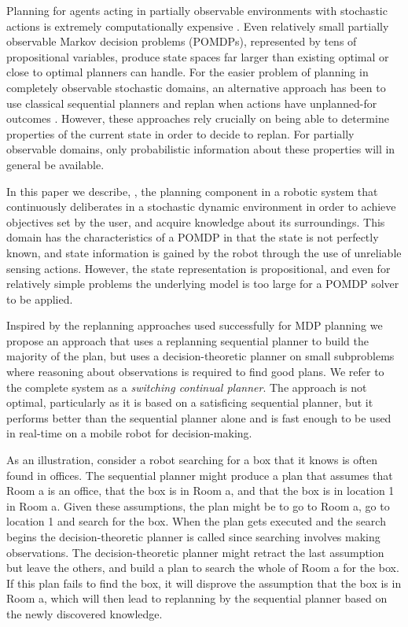 Planning for agents acting in partially observable environments with
stochastic actions is extremely computationally
expensive \cite{mdp-complexity}. Even relatively small partially
observable Markov decision problems (POMDPs), represented by tens of
propositional variables, produce state spaces far larger than existing
optimal or close to optimal planners can handle. For the easier
problem of planning in completely observable stochastic domains, an
alternative approach has been to use classical sequential planners and
replan when actions have unplanned-for
outcomes \cite{yoon:etal:2007}. However, these approaches rely
crucially on being able to determine properties of the current state
in order to decide to replan. For partially observable domains, only
probabilistic information about these properties will in general be
available.

In this paper we describe, \pcogx, the planning component in a robotic
system that continuously deliberates in a stochastic dynamic
environment in order to achieve objectives set by the user, and
acquire knowledge about its surroundings. This domain has the
characteristics of a POMDP in that the state is not perfectly known,
and state information is gained by the robot through the use of
unreliable sensing actions. However, the state representation is
propositional, and even for relatively simple problems the underlying
model is too large for a POMDP solver to be applied.

Inspired by the replanning approaches used successfully for MDP
planning \cite{yoon:etal:2007,yoon:etal:2008} we propose an approach
that uses a replanning sequential planner to build the majority of the
plan, but uses a decision-theoretic planner on small subproblems where
reasoning about observations is required to find good plans. We refer
to the complete system as a {\em switching continual planner}. The
approach is not optimal, particularly as it is based on a satisficing
sequential planner, but it performs better than the sequential planner
alone and is fast enough to be used in real-time on a mobile robot for
decision-making. 

As an illustration, consider a robot searching for a box that it knows
is often found in offices. The sequential planner might produce a plan
that assumes that {\sc Room a} is an office, that the box is in {\sc
Room a}, and that the box is in location 1 in {\sc Room a}. Given
these assumptions, the plan might be to go to {\sc Room a}, go to
location 1 and search for the box. When the plan gets executed and the
search begins the decision-theoretic planner is called since searching
involves making observations. The decision-theoretic planner might
retract the last assumption but leave the others, and build a plan to
search the whole of {\sc Room a} for the box. If this plan fails to
find the box, it will disprove the assumption that the box is in {\sc
Room a}, which will then lead to replanning by the sequential planner
based on the newly discovered knowledge.

